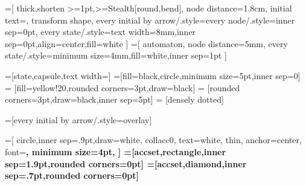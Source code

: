 \usetikzlibrary{automata}
\usetikzlibrary{arrows.meta}
\usetikzlibrary{bending}
\usetikzlibrary{shapes.callouts}
\usetikzlibrary{quotes}
\usetikzlibrary{positioning}
\usetikzlibrary{calc}

=[
  thick,shorten >=1pt,>={Stealth[round,bend]},
  node distance=1.8cm,
  initial text=,
  transform shape,
  every initial by arrow/.style={every node/.style={inner sep=0pt}},
  every state/.style={text width=8mm,inner sep=0pt,align=center,fill=white}
]
=[
  automaton,
  node distance=5mm,
  every state/.style={minimum size=4mm,fill=white,inner sep=1pt}
]

=[state,capsule,text width=]
=[fill=black,circle,minimum size=5pt,inner sep=0]
 = [fill=yellow!20,rounded corners=3pt,draw=black]
 = [rounded corners=3pt,draw=black,inner sep=5pt]
 = [densely dotted]

\makeatletter
{}
\makeatother

=[every initial by arrow/.style={overlay}]


=[
  circle,inner sep=.9pt,draw=white,
  collacc0, text=white,
  thin,
  anchor=center,
  font=\bfseries\sffamily\scriptsize,
  minimum size={4pt},
]
=[accset,rectangle,inner sep=1.9pt,rounded corners=0pt]
=[accset,diamond,inner sep=.7pt,rounded corners=0pt]

